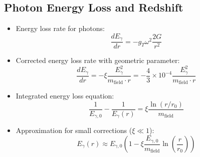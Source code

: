\documentclass[12pt,a4paper]{article}
\begin{document}
	\subsection{Photon Energy Loss and Redshift}
	\begin{itemize}
		\item Energy loss rate for photons:
		\begin{equation}
			\frac{dE_\gamma}{dr} = -g_T \omega^2 \frac{2G}{r^2}
		\end{equation}
		
		\item Corrected energy loss rate with geometric parameter:
		\begin{equation}
			\boxed{\frac{dE_\gamma}{dr} = -\xi \frac{E_\gamma^2}{m_{\text{field}} \cdot r} = -\frac{4}{3} \times 10^{-4} \frac{E_\gamma^2}{m_{\text{field}} \cdot r}}
		\end{equation}
		
		\item Integrated energy loss equation:
		\begin{equation}
			\frac{1}{E_{\gamma,0}} - \frac{1}{E_\gamma(r)} = \xi \frac{\ln(r/r_0)}{m_{\text{field}}}
		\end{equation}
		
		\item Approximation for small corrections ($\xi \ll 1$):
		\begin{equation}
			E_\gamma(r) \approx E_{\gamma,0} \left(1 - \xi \frac{E_{\gamma,0}}{m_{\text{field}}} \ln\left(\frac{r}{r_0}\right)\right)
		\end{equation}
	\end{itemize}
	
\end{document}
